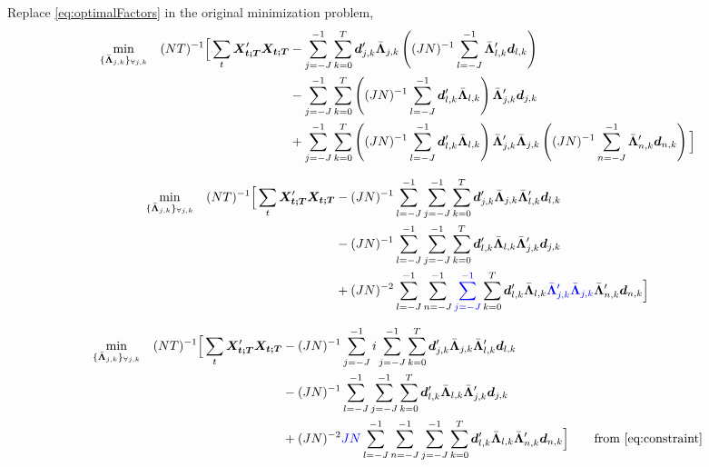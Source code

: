 \documentclass[main_document.tex]{subfiles}
\begin{document}
	Replace \eqref{eq:optimalFactors} in the original minimization problem, 
	\begin{align*}
		\min_{\setOptLoadings} \quad (NT)^{-1} \Big[ \sum_t \X{t}'\X{t} &- \scalesum{j} \locsum{k}\coeffs{j}{k}' \optLoadings{j}{k}\left((JN)^{-1}\scalesum{l}  \optLoadings{l}{k}' \coeffs{l}{k}\right) \\
		&- \scalesum{j} \locsum{k} \left((JN)^{-1}\scalesum{l}  \coeffs{l}{k}' \optLoadings{l}{k} \right)\optLoadings{j}{k}' \coeffs{j}{k} \\
	       &+ \scalesum{j} \locsum{k} \left((JN)^{-1}\scalesum{l}  \coeffs{l}{k}' \optLoadings{l}{k} \right)\optLoadings{j}{k}'\optLoadings{j}{k}\left((JN)^{-1}\sum_{n=-J}^{-1}  \optLoadings{n}{k}' \coeffs{n}{k}\right) \Big]
	\end{align*}

	\begin{align*}
		\min_{\setOptLoadings} \quad (NT)^{-1} \Big[ \sum_t \X{t}'\X{t} &- (JN)^{-1}\scalesum{l} \scalesum{j} \locsum{k} \coeffs{j}{k}' \optLoadings{j}{k}\optLoadings{l}{k}' \coeffs{l}{k} \\
		&- (JN)^{-1}\scalesum{l} \scalesum{j} \locsum{k} \coeffs{l}{k}' \optLoadings{l}{k} \optLoadings{j}{k}' \coeffs{j}{k} \\
	       &+ (JN)^{-2}\scalesum{l} \sum_{n=-J}^{-1} \textcolor{blue}{\scalesum{j}} \locsum{k} \coeffs{l}{k}' \optLoadings{l}{k} \textcolor{blue}{\optLoadings{j}{k}' \optLoadings{j}{k}} \optLoadings{n}{k}' \coeffs{n}{k} \Big]
	\end{align*}

	\begin{align*}
		\min_{\setOptLoadings} \quad (NT)^{-1} \Big[ \sum_t \X{t}'\X{t} &- (JN)^{-1}\scalesum{j}i \scalesum{j} \locsum{k} \coeffs{j}{k}' \optLoadings{j}{k}\optLoadings{l}{k}' \coeffs{l}{k} \\
		&- (JN)^{-1}\scalesum{l} \scalesum{j} \locsum{k} \coeffs{l}{k}' \optLoadings{l}{k} \optLoadings{j}{k}' \coeffs{j}{k} \\
	       &+ (JN)^{-2} \textcolor{blue}{JN}\scalesum{l} \sum_{n=-J}^{-1} \scalesum{j} \locsum{k} \coeffs{l}{k}' \optLoadings{l}{k} \optLoadings{n}{k}' \coeffs{n}{k} \Big] 			&\quad \text{from } \eqref{eq:constraint}
	\end{align*}
\end{document}
